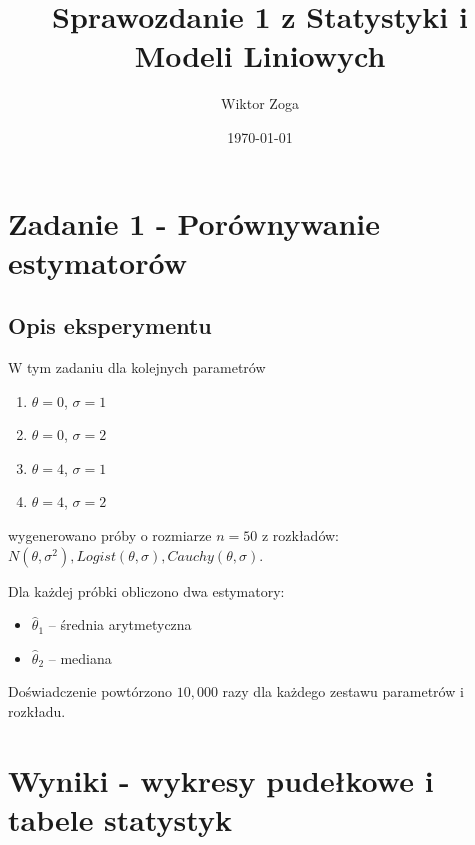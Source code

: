 \documentclass[a4paper,12pt]{article}
\title{Sprawozdanie 1 z Statystyki i Modeli Liniowych}
\author{Wiktor Zoga}
\date{\today}
\begin{document}
\maketitle
\newpage

\section{Zadanie 1 - Porównywanie estymatorów}

\subsection{Opis eksperymentu}
W tym zadaniu dla kolejnych parametrów

\begin{enumerate}
    \item $\theta = 0$, $\sigma = 1$
    \item $\theta = 0$, $\sigma = 2$
    \item $\theta = 4$, $\sigma = 1$
    \item $\theta = 4$, $\sigma = 2$
\end{enumerate}

wygenerowano próby o rozmiarze $n=50$ z rozkładów: $ N(\theta, \sigma^2), Logist(\theta, \sigma), Cauchy(\theta, \sigma)$.

Dla każdej próbki obliczono dwa estymatory:

\begin{itemize}
    \item $\hat{\theta}_1$ -- średnia arytmetyczna
    \item $\hat{\theta}_2$ -- mediana
\end{itemize}

Doświadczenie powtórzono $10{,}000$ razy dla każdego zestawu parametrów i rozkładu.

\newpage

\section{Wyniki - wykresy pudełkowe i tabele statystyk}
\end{document}
